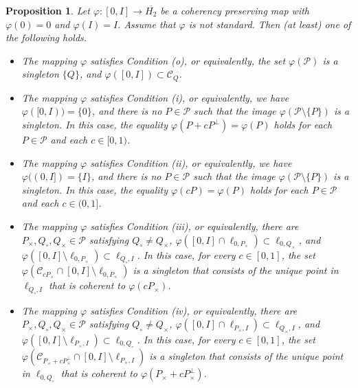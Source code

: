 \documentclass[10pt]{amsart}
\newtheorem{proposition}[theorem]{Proposition}
\theoremstyle{definition}
\theoremstyle{remark}
\numberwithin{subsection}{section}
\numberwithin{equation}{section}
\newcommand\oH{{\overline{H_2}}}
\begin{document}
\begin{proposition}\label{proposition08}
Let $\varphi\colon [0, I]\to \oH$ be a coherency preserving map with $\varphi(0)=0$ and $\varphi(I)=I$. 
Assume that $\varphi$ is not standard. Then (at least) one of the following holds.
\begin{itemize}
\item The mapping $\varphi$ satisfies Condition (o), or equivalently, the set $\varphi(\mathcal{P})$ is a singleton $\{Q\}$, and $\varphi([0, I])\subset \mathcal{C}_Q$. 
\item The mapping $\varphi$ satisfies Condition (i), or equivalently, we have $\varphi([0, I))=\{0\}$, and there is no $P\in \mathcal{P}$ such that the image $\varphi(\mathcal{P}\setminus \{P\})$ is a singleton. In this case, the equality $\varphi(P+cP^\perp)=\varphi(P)$ holds for each $P\in \mathcal{P}$ and each $c\in [0, 1)$.
\item The mapping $\varphi$ satisfies Condition (ii), or equivalently, we have $\varphi((0, I])=\{I\}$, and there is no $P\in \mathcal{P}$ such that the image $\varphi(\mathcal{P}\setminus \{P\})$ is a singleton. In this case, the equality $\varphi(cP)=\varphi(P)$ holds for each $P\in \mathcal{P}$ and each $c\in (0, 1]$.
\item The mapping $\varphi$ satisfies Condition (iii), or equivalently, there are $P_\times, Q_\circ, Q_\times\in \mathcal{P}$ satisfying $Q_\circ\neq Q_\times$, $\varphi([0,I] \cap \ell_{0, P_\times})\subset \ell_{0,Q_\times}$, and $\varphi([0,I] \setminus \ell_{0, P_\times})\subset \ell_{Q_\circ,I}$.
In this case, for every $c\in [0,1]$, the set $\varphi(\mathcal{C}_{cP_\times}\cap [0, I]\setminus \ell_{0, P_\times})$ is a singleton that consists of the unique point in $\ell_{Q_\circ, I}$ that is coherent to $\varphi(cP_\times)$.
\item The mapping $\varphi$ satisfies Condition (iv), or equivalently, there are $P_\times, Q_\circ, Q_\times\in \mathcal{P}$ satisfying $Q_\circ\neq Q_\times$, $\varphi([0,I] \cap \ell_{P_\times,I})\subset \ell_{Q_\times, I}$, and $\varphi([0,I] \setminus \ell_{P_\times, I})\subset \ell_{0,Q_\circ}$.
In this case, for every $c\in [0,1]$, the set $\varphi(\mathcal{C}_{P_\times+cP_\times^\perp}\cap [0, I]\setminus \ell_{ P_\times, I})$ is a singleton that consists of the unique point in $\ell_{0,Q_\circ}$ that is coherent to $\varphi(P_\times+cP_\times^\perp)$.
\end{itemize} 
\end{proposition}
\end{document}
